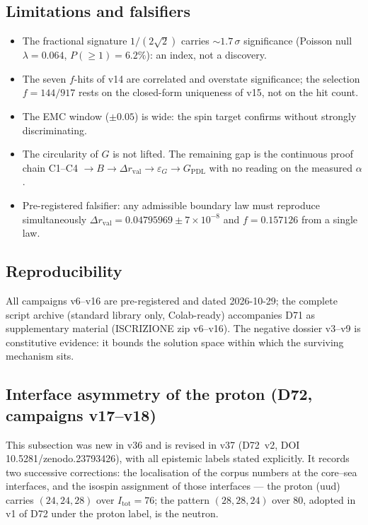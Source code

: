 \documentclass[11pt,a4paper]{article}
\theoremstyle{plain}
\theoremstyle{definition}
\theoremstyle{remark}
\begin{document}
\subsection{Limitations and falsifiers}
\begin{itemize}
\item The fractional signature $1/(2\sqrt{2})$ carries $\sim1.7\,\sigma$ significance (Poisson null $\lambda=0.064$, $P(\geq1)=6.2\%$): an index, not a discovery.
\item The seven $f$-hits of v14 are correlated and overstate significance; the selection $f=144/917$ rests on the closed-form uniqueness of v15, not on the hit count.
\item The EMC window ($\pm0.05$) is wide: the spin target confirms without strongly discriminating.
\item \textcolor{negativered}{The circularity of $G$ is not lifted.} The remaining gap is the continuous proof chain C1--C4 $\to B\to\Delta r_{\mathrm{val}}\to\varepsilon_{G}\to G_{\mathrm{PDL}}$ with no reading on the measured $\alpha$.
\item Pre-registered falsifier: any admissible boundary law must reproduce simultaneously $\Delta r_{\mathrm{val}}=0.04795969\pm7\times10^{-8}$ and $f=0.157126$ from a single law.
\end{itemize}

\subsection{Reproducibility}
All campaigns v6--v16 are pre-registered and dated 2026-10-29; the complete script archive (standard library only, Colab-ready) accompanies D71 as supplementary material (ISCRIZIONE zip v6--v16). The negative dossier v3--v9 is constitutive evidence: it bounds the solution space within which the surviving mechanism sits.

\subsection{Interface asymmetry of the proton (D72, campaigns v17--v18)}
\label{sec:D72}
This subsection was new in v36 and is revised in v37 (D72~v2, DOI 10.5281/zenodo.23793426), with all epistemic labels stated explicitly. It records two successive corrections: the localisation of the corpus numbers at the core--sea interfaces, and the isospin assignment of those interfaces --- the proton (uud) carries $(24,24,28)$ over $I_{\mathrm{tot}}=76$; the pattern $(28,28,24)$ over $80$, adopted in v1 of D72 under the proton label, is the neutron.
\end{document}
